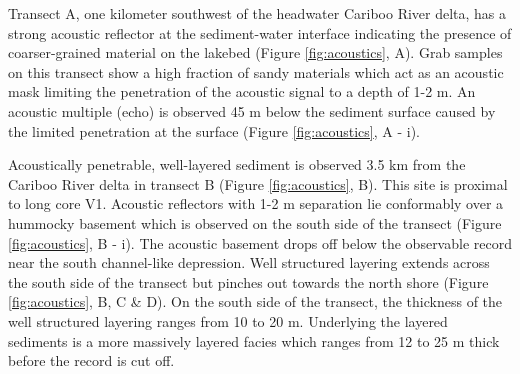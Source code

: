\documentclass[Royal,times,doublespace,sageh]{sagej}
\begin{document}
Transect A, one kilometer southwest of the headwater Cariboo River
delta, has a strong acoustic reflector at the sediment-water interface
indicating the presence of coarser-grained material on the lakebed
(Figure \ref{fig:acoustics}, A). Grab samples on this transect show a
high fraction of sandy materials which act as an acoustic mask limiting
the penetration of the acoustic signal to a depth of 1-2 m. An acoustic
multiple (echo) is observed 45 m below the sediment surface caused by
the limited penetration at the surface (Figure \ref{fig:acoustics}, A -
i).

Acoustically penetrable, well-layered sediment is observed 3.5 km from
the Cariboo River delta in transect B (Figure \ref{fig:acoustics}, B).
This site is proximal to long core V1. Acoustic reflectors with 1-2 m
separation lie conformably over a hummocky basement which is observed on
the south side of the transect (Figure \ref{fig:acoustics}, B - i). The
acoustic basement drops off below the observable record near the south
channel-like depression. Well structured layering extends across the
south side of the transect but pinches out towards the north shore
(Figure \ref{fig:acoustics}, B, C \& D). On the south side of the
transect, the thickness of the well structured layering ranges from 10
to 20 m. Underlying the layered sediments is a more massively layered
facies which ranges from 12 to 25 m thick before the record is cut off.
\end{document}
